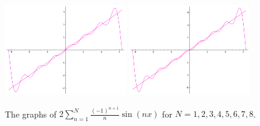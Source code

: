 \begin{figure}
\includegraphics[width=200px]{fourier-7.png}
\includegraphics[width=200px]{fourier-8.png}
\caption{The graphs of $2\sum_{n=1}^N\frac{(-1)^{n+1}}{n}\sin(nx)$ for $N=1,2,3,4,5,6,7,8$.}
\end{figure}

